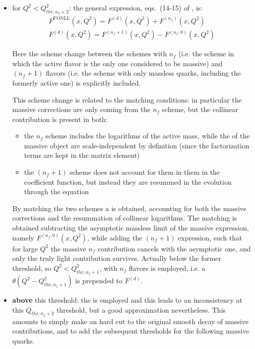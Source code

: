 \begin{itemize}
  \item for \textbf{$Q^2 < Q_{thr,n_f+2}^2$}: the general expression,
    eqs.~(14-15) of \cite{Forte:2010ta}, is:
    \begin{align}
        F^{\text{FONLL}}(x, Q^2) = F^{(d)}(x, Q^2) + F^{(n_f)}(x, Q^2)\\
        F^{(d)}(x, Q^2) = F^{(n_f + 1)}(x, Q^2) - F^{(n_f, 0)}(x, Q^2)
        \label{eq:dis/fonll}
    \end{align}

    Here the scheme change between the schemes with $n_f$ (i.e. the \ffns
    scheme in which the active flavor is the only one considered to be massive)
    and $(n_f + 1)$ flavors (i.e. the \ffns scheme with only massless quarks,
    including the formerly active one) is explicitly included.

    This scheme change is related to the \dglap matching conditions: in
    particular the massive corrections are only coming from the $n_f$
    scheme, but the collinear contribution is present in both:
    \begin{itemize}
      \item the $n_f$ scheme includes the logarithms of the active mass,
          while the \pdf of the massive object are scale-independent by definition
          (since the factorization terms are kept in the matrix element)
      \item the $(n_f + 1)$ scheme does not account for them in them in the coefficient
          function, but instead they are resummed in the \pdf evolution through the
          \dglap equation
    \end{itemize}

    By matching the two schemes a \gmvfns is obtained, accounting for both the
    massive corrections and the resummation of collinear logarithms.
    The matching is obtained subtracting the asymptotic massless limit of the
    massive expression, namely $F^{(n_f, 0)}(x, Q^2)$, while adding the
    $(n_f + 1)$ expression, such that for large $Q^2$ the massive
    $n_f$ contribution cancels with the asymptotic one, and only the truly
    light contribution survives.
    Actually below the former threshold, so $Q^2 < Q_{thr,n_f+1}^2$, \fns
    with $n_f$ flavors is employed, i.e. a $\theta(Q^2 - Q_{thr,n_f+1}^2)$ is
    prepended to $F^{(d)}$.

  \item \textbf{above} this threshold: the \zmvfns is employed and this leads
    to an inconsistency at this $Q_{thr,n_f+2}$ threshold, but a good
    approximation nevertheless.
    This amounts to simply make an hard cut to the original smooth decay of
    massive contributions, and to add the subsequent thresholds for the following
    massive quarks.
\end{itemize}

